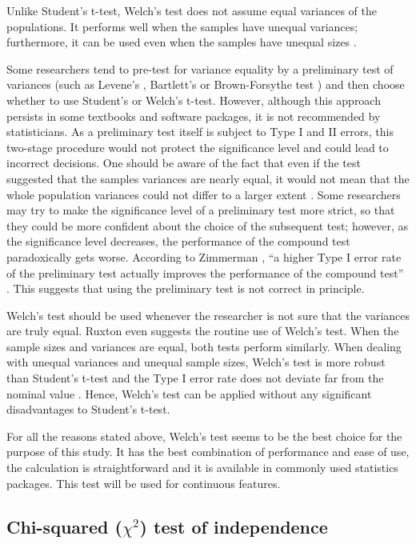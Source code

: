 Unlike Student's t-test, Welch's test does not assume equal variances of the populations. It performs well when the samples have unequal variances; furthermore, it can be used even when the samples have unequal sizes \cite{derrick}.

Some researchers tend to pre-test for variance equality by a preliminary test of variances (such as Levene's \cite{levene}, Bartlett's \cite{bartlett} or Brown-Forsythe test \cite{brown}) and then choose whether to use Student's or Welch's t-test. However, although this approach persists in some textbooks and software packages, it is not recommended by statisticians. As a preliminary test itself is subject to Type I and II errors, this two-stage procedure would not protect the significance level and could lead to incorrect decisions. One should be aware of the fact that even if the test suggested that the samples variances are nearly equal, it would not mean that the whole population variances could not differ to a larger extent \cite{zimmerman}. Some researchers may try to make the significance level of a preliminary test more strict, so that they could be more confident about the choice of the subsequent test; however, as the significance level decreases, the performance of the compound test paradoxically gets worse. According to Zimmerman \cite{zimmerman}, ``a higher Type I error rate of the preliminary test actually improves the performance of the compound test'' \cite{zimmerman}. This suggests that using the preliminary test is not correct in principle.

Welch's test should be used whenever the researcher is not sure that the variances are truly equal. Ruxton \cite{ruxton} even suggests the routine use of Welch's test. When the sample sizes and variances are equal, both tests perform similarly. When dealing with unequal variances and unequal sample sizes, Welch's test is more robust than Student's t-test and the Type I error rate does not deviate far from the nominal value \cite{derrick}. Hence, Welch's test can be applied without any significant disadvantages to Student's t-test.

For all the reasons stated above, Welch's test seems to be the best choice for the purpose of this study. It has the best combination of performance and ease of use, the calculation is straightforward and it is available in commonly used statistics packages. This test will be used for continuous features.

\subsection{Chi-squared ($\chi^{2}$) test of independence}

